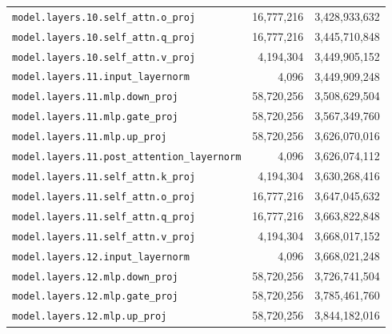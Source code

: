 \documentclass[10pt,a4paper]{article}
\theoremstyle{definition}
\begin{document}
\begin{appendices}
\begin{longtable}{p{9.5cm}rr}
\texttt{model.\allowbreak{}layers.\allowbreak{}10.\allowbreak{}self\_attn.\allowbreak{}o\_proj} & 16,777,216 & 3,428,933,632 \\
\texttt{model.\allowbreak{}layers.\allowbreak{}10.\allowbreak{}self\_attn.\allowbreak{}q\_proj} & 16,777,216 & 3,445,710,848 \\
\texttt{model.\allowbreak{}layers.\allowbreak{}10.\allowbreak{}self\_attn.\allowbreak{}v\_proj} & 4,194,304 & 3,449,905,152 \\
\texttt{model.\allowbreak{}layers.\allowbreak{}11.\allowbreak{}input\_layernorm} & 4,096 & 3,449,909,248 \\
\texttt{model.\allowbreak{}layers.\allowbreak{}11.\allowbreak{}mlp.\allowbreak{}down\_proj} & 58,720,256 & 3,508,629,504 \\
\texttt{model.\allowbreak{}layers.\allowbreak{}11.\allowbreak{}mlp.\allowbreak{}gate\_proj} & 58,720,256 & 3,567,349,760 \\
\texttt{model.\allowbreak{}layers.\allowbreak{}11.\allowbreak{}mlp.\allowbreak{}up\_proj} & 58,720,256 & 3,626,070,016 \\
\texttt{model.\allowbreak{}layers.\allowbreak{}11.\allowbreak{}post\_attention\_layernorm} & 4,096 & 3,626,074,112 \\
\texttt{model.\allowbreak{}layers.\allowbreak{}11.\allowbreak{}self\_attn.\allowbreak{}k\_proj} & 4,194,304 & 3,630,268,416 \\
\texttt{model.\allowbreak{}layers.\allowbreak{}11.\allowbreak{}self\_attn.\allowbreak{}o\_proj} & 16,777,216 & 3,647,045,632 \\
\texttt{model.\allowbreak{}layers.\allowbreak{}11.\allowbreak{}self\_attn.\allowbreak{}q\_proj} & 16,777,216 & 3,663,822,848 \\
\texttt{model.\allowbreak{}layers.\allowbreak{}11.\allowbreak{}self\_attn.\allowbreak{}v\_proj} & 4,194,304 & 3,668,017,152 \\
\texttt{model.\allowbreak{}layers.\allowbreak{}12.\allowbreak{}input\_layernorm} & 4,096 & 3,668,021,248 \\
\texttt{model.\allowbreak{}layers.\allowbreak{}12.\allowbreak{}mlp.\allowbreak{}down\_proj} & 58,720,256 & 3,726,741,504 \\
\texttt{model.\allowbreak{}layers.\allowbreak{}12.\allowbreak{}mlp.\allowbreak{}gate\_proj} & 58,720,256 & 3,785,461,760 \\
\texttt{model.\allowbreak{}layers.\allowbreak{}12.\allowbreak{}mlp.\allowbreak{}up\_proj} & 58,720,256 & 3,844,182,016 \\

\end{longtable}
\end{appendices}
\end{document}
